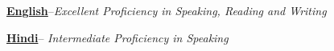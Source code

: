 

\begin{cvlanguages}

  \cvlang
    { {\bf\href{}{English}}--\textit{Excellent Proficiency in Speaking, Reading and Writing} \href{}{}} %
    {} %

  \cvlang
    { {\bf\href{}{Hindi}}-- \textit{Intermediate Proficiency in Speaking} \href{}{}} %
    {} %

\end{cvlanguages}
